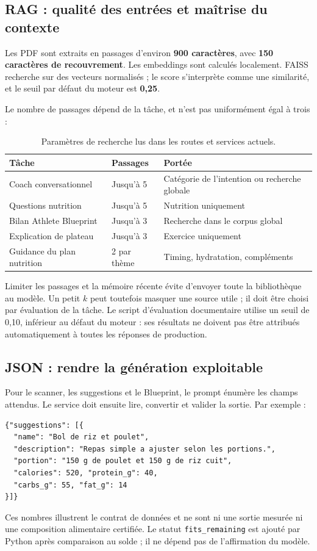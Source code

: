 \documentclass[11pt,a4paper]{article}
\begin{document}
\clearpage
\subsection{RAG : qualité des entrées et maîtrise du contexte}
Les PDF sont extraits en passages d'environ \textbf{900 caractères}, avec \textbf{150 caractères de recouvrement}. Les embeddings sont calculés localement. FAISS recherche sur des vecteurs normalisés ; le score s'interprète comme une similarité, et le seuil par défaut du moteur est \textbf{0,25}.

Le nombre de passages dépend de la tâche, et n'est pas uniformément égal à trois :
\begin{table}[H]
\small\begin{tabularx}{\linewidth}{Xp{2cm}X}
\toprule
\textbf{Tâche} & \textbf{Passages} & \textbf{Portée} \\
\midrule
Coach conversationnel & Jusqu'à 5 & Catégorie de l'intention ou recherche globale \\
Questions nutrition & Jusqu'à 5 & Nutrition uniquement \\
Bilan Athlete Blueprint & Jusqu'à 3 & Recherche dans le corpus global \\
Explication de plateau & Jusqu'à 3 & Exercice uniquement \\
Guidance du plan nutrition & 2 par thème & Timing, hydratation, compléments \\
\bottomrule
\end{tabularx}
\caption{Paramètres de recherche lus dans les routes et services actuels.}
\end{table}

Limiter les passages et la mémoire récente évite d'envoyer toute la bibliothèque au modèle. Un petit \(k\) peut toutefois masquer une source utile ; il doit être choisi par évaluation de la tâche. Le script d'évaluation documentaire utilise un seuil de 0,10, inférieur au défaut du moteur : ses résultats ne doivent pas être attribués automatiquement à toutes les réponses de production.

\subsection{JSON : rendre la génération exploitable}
Pour le scanner, les suggestions et le Blueprint, le prompt énumère les champs attendus. Le service doit ensuite lire, convertir et valider la sortie. Par exemple :
\begin{lstlisting}[caption={Forme de sortie attendue pour une idée de repas ; valeurs illustratives}]
{"suggestions": [{
  "name": "Bol de riz et poulet",
  "description": "Repas simple a ajuster selon les portions.",
  "portion": "150 g de poulet et 150 g de riz cuit",
  "calories": 520, "protein_g": 40,
  "carbs_g": 55, "fat_g": 14
}]}
\end{lstlisting}
Ces nombres illustrent le contrat de données et ne sont ni une sortie mesurée ni une composition alimentaire certifiée. Le statut \texttt{fits\_remaining} est ajouté par Python après comparaison au solde ; il ne dépend pas de l'affirmation du modèle.
\end{document}
